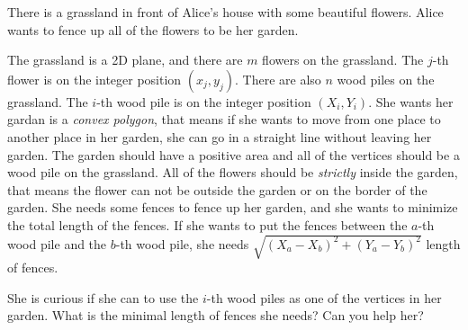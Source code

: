 There is a grassland in front of Alice's house with some beautiful flowers.
Alice wants to fence up all of the flowers to be her garden.

The grassland is a 2D plane, and there are $m$ flowers on the grassland.
The $j$-th flower is on the integer position $(x_j,y_j)$.
There are also $n$ wood piles on the grassland.
The $i$-th wood pile is on the integer position $(X_i,Y_i)$.
She wants her gardan is a \emph{convex polygon}, 
that means if she wants to move from one place to another place in her garden, 
she can go in a straight line without leaving her garden.
The garden should have a positive area and all of the vertices should be a wood pile on the grassland.
All of the flowers should be \emph{strictly} inside the garden, 
that means the flower can not be outside the garden or on the border of the garden.
She needs some fences to fence up her garden, and she wants to minimize the total length of the fences.
If she wants to put the fences between the $a$-th wood pile and the $b$-th wood pile, she needs $\sqrt{(X_a-X_b)^2+(Y_a-Y_b)^2}$ length of fences.

She is curious if she can to use the $i$-th  wood piles as one of the vertices in her garden.
What is the minimal length of fences she needs? Can you help her?

